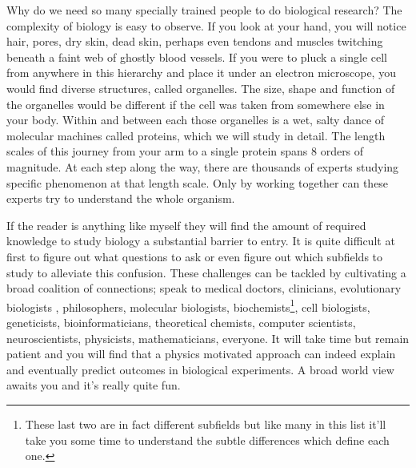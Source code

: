 Why do we need so many specially trained people to do biological research? The complexity of biology is easy to observe. If you look at your hand, you will notice hair, pores, dry skin, dead skin, perhaps even tendons and muscles twitching beneath a faint web of ghostly blood vessels. If you were to pluck a single cell from anywhere in this hierarchy and place it under an electron microscope, you would find diverse structures, called organelles. The size, shape and function of the organelles would be different if the cell was taken from somewhere else in your body. Within and between each those organelles is a wet, salty dance of molecular machines called proteins, which we will study in detail. The length scales of this journey from your arm to a single protein spans 8 orders of magnitude. At each step along the way, there are thousands of experts studying specific phenomenon at that length scale. Only by working together can these experts try to understand the whole organism.

If the reader is anything like myself they will find the amount of required knowledge to study biology a substantial barrier to entry. It is quite difficult at first to figure out what questions to ask or even figure out which subfields to study to alleviate this confusion. These challenges can be tackled by cultivating a broad coalition of connections; speak to medical doctors, clinicians, evolutionary biologists \cite{dawkins1989, dawkins2016}, philosophers, molecular biologists, biochemists\footnote{These last two are in fact different subfields but like many in this list it'll take you some time to understand the subtle differences which define each one.}, cell biologists, geneticists, bioinformaticians, theoretical chemists, computer scientists, neuroscientists, physicists, mathematicians, everyone. It will take time but remain patient and you will find that a physics motivated approach can indeed explain and eventually predict outcomes in biological experiments. A broad world view awaits you and it's really quite fun. 

